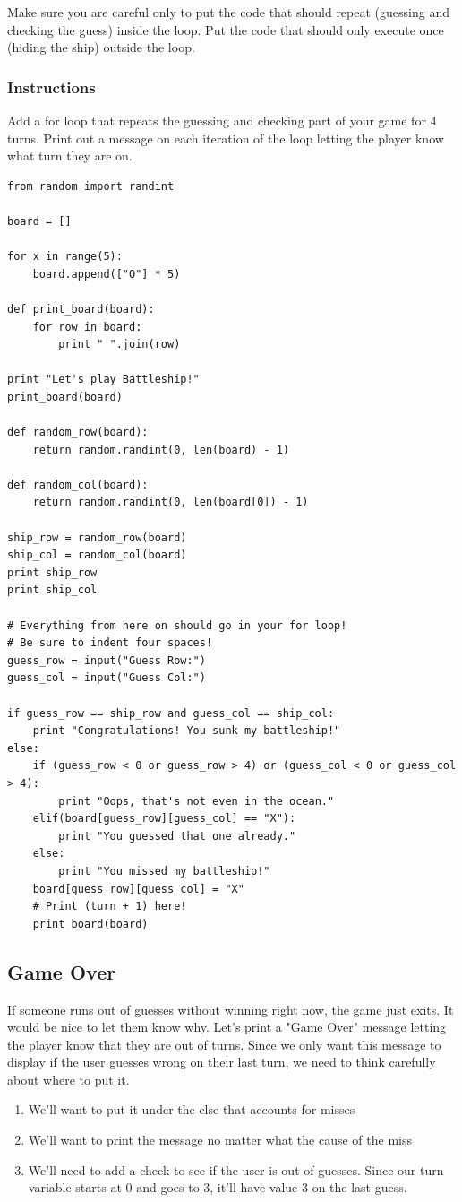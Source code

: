 \documentclass[12pt,a4paper,final,twoside,onecolumn,titlepage]{book}
\begin{document}
Make sure you are careful only to put the code that should repeat (guessing and checking the guess) inside the loop. Put the code that should only execute once (hiding the ship) outside the loop.
\subsubsection{Instructions}

Add a for loop that repeats the guessing and checking part of your game for 4 turns. Print out a message on each iteration of the loop letting the player know what turn they are on.
\begin{lstlisting}
from random import randint

board = []

for x in range(5):
    board.append(["O"] * 5)

def print_board(board):
    for row in board:
        print " ".join(row)

print "Let's play Battleship!"
print_board(board)

def random_row(board):
    return random.randint(0, len(board) - 1)

def random_col(board):
    return random.randint(0, len(board[0]) - 1)

ship_row = random_row(board)
ship_col = random_col(board)
print ship_row
print ship_col

# Everything from here on should go in your for loop!
# Be sure to indent four spaces!
guess_row = input("Guess Row:")
guess_col = input("Guess Col:")

if guess_row == ship_row and guess_col == ship_col:
    print "Congratulations! You sunk my battleship!"
else:
    if (guess_row < 0 or guess_row > 4) or (guess_col < 0 or guess_col > 4):
        print "Oops, that's not even in the ocean."
    elif(board[guess_row][guess_col] == "X"):
        print "You guessed that one already."
    else:
        print "You missed my battleship!"
    board[guess_row][guess_col] = "X"
    # Print (turn + 1) here!
    print_board(board)
\end{lstlisting}

\subsection{Game Over}

If someone runs out of guesses without winning right now, the game just exits. It would be nice to let them know why. Let’s print a "Game Over" message letting the player know that they are out of turns. Since we only want this message to display if the user guesses wrong on their last turn, we need to think carefully about where to put it.
\begin{enumerate}
\item We’ll want to put it under the else that accounts for misses
\item We’ll want to print the message no matter what the cause of the miss
\item We’ll need to add a check to see if the user is out of guesses. Since our turn variable starts at 0 and goes to 3, it'll have value 3 on the last guess.
\end{enumerate}
\end{document}
